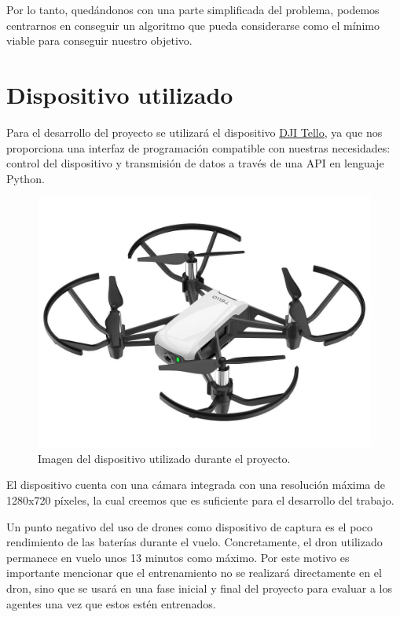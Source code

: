 Por lo tanto, quedándonos con una parte simplificada del problema, podemos centrarnos en conseguir un algoritmo que pueda considerarse como el mínimo viable para conseguir nuestro objetivo.
\medskip

\section{Dispositivo utilizado}
\label{dispositivo-utilizado}

Para el desarrollo del proyecto se utilizará el dispositivo \href{https://store.dji.com/de/shop/tello-series}{DJI Tello}, ya que nos proporciona una interfaz de programación compatible con nuestras necesidades: control del dispositivo y transmisión de datos a través de una API en lenguaje Python.
\medskip


\begin{figure}[ht!]
  \centering
  \includegraphics[scale=0.2]{figuras/dispositivo_utilizado.png}
  \caption[DJI Tello. Dispositivo utilizado durante el proyecto]{Imagen del dispositivo utilizado durante el proyecto.}
  \label{fig-dron}
\end{figure}


El dispositivo cuenta con una cámara integrada con una resolución máxima de 1280x720 píxeles, la cual creemos que es suficiente para el desarrollo del trabajo.
\medskip

Un punto negativo del uso de drones como dispositivo de captura es el poco rendimiento de las baterías durante el vuelo. Concretamente, el dron utilizado permanece en vuelo unos 13 minutos como máximo. Por este motivo es importante mencionar que el entrenamiento no se realizará directamente en el dron, sino que se usará en una fase inicial y final del proyecto para evaluar a los agentes una vez que estos estén entrenados.
\medskip

